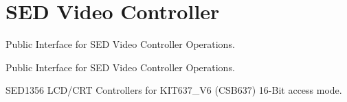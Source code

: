 \hypertarget{group__csb337__sed1356}{}\section{S\+ED Video Controller}
\label{group__csb337__sed1356}


Public Interface for S\+ED Video Controller Operations.  


Public Interface for S\+ED Video Controller Operations. 

S\+E\+D1356 L\+C\+D/\+C\+RT Controllers for K\+I\+T637\+\_\+\+V6 (C\+S\+B637) 16-\/Bit access mode.